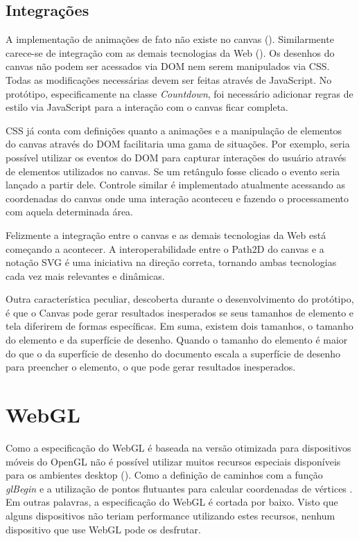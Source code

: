 \subsection{Integrações}

A implementação de animações de fato não existe no canvas
(). Similarmente carece-se de integração
com as demais tecnologias da Web ().
Os desenhos do canvas não podem ser acessados via DOM nem serem
manipulados via CSS. Todas as modificações necessárias devem ser
feitas através de JavaScript. No protótipo, especificamente na classe
\textit{Countdown}, foi necessário adicionar regras de estilo via
JavaScript para a interação com o canvas ficar completa.

CSS já conta com definições quanto a animações e a manipulação de
elementos do canvas através do DOM facilitaria uma gama de situações.
Por exemplo, seria possível utilizar os eventos do DOM para capturar
interações do usuário através de elementos utilizados no canvas.
Se um retângulo fosse clicado o evento seria lançado a partir dele.
Controle similar é implementado atualmente acessando as coordenadas
do canvas onde uma interação aconteceu e fazendo o processamento com
aquela determinada área.

Felizmente a integração entre o canvas e as demais tecnologias da
Web está começando a acontecer. A interoperabilidade entre o Path2D
do canvas e a notação SVG é uma iniciativa na direção correta,
tornando ambas tecnologias cada vez mais relevantes e dinâmicas.

Outra característica peculiar, descoberta durante o desenvolvimento
do protótipo, é que o Canvas pode gerar resultados inesperados se
seus tamanhos de elemento e tela diferirem de formas específicas. Em
suma, existem dois tamanhos, o tamanho do elemento e da superfície de
desenho. Quando o tamanho do elemento é maior do que o da superfície
de desenho do documento escala a superfície de desenho para preencher o
elemento, o que pode gerar resultados inesperados.

\section{WebGL}

Como a especificação do WebGL é baseada na versão otimizada
para dispositivos móveis do OpenGL não é possível utilizar
muitos recursos especiais disponíveis para os ambientes desktop
(). Como a definição de caminhos
com a função \textit{glBegin} e a utilização de pontos flutuantes
para calcular coordenadas de vértices \autocite{esVsGl}. Em outras
palavras, a especificação do WebGL é cortada por baixo. Visto que
alguns dispositivos não teriam performance utilizando estes recursos,
nenhum dispositivo que use WebGL pode os desfrutar.

